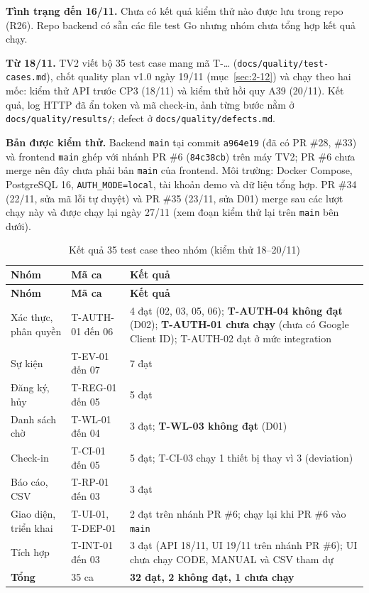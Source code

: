\textbf{Tình trạng đến 16/11.} Chưa có kết quả kiểm thử nào được lưu trong repo (R26). Repo backend có sẵn các file test Go nhưng nhóm chưa tổng hợp kết quả chạy.

\textbf{Từ 18/11.} TV2 viết bộ 35 test case mang mã T-\ldots{} (\texttt{docs/\allowbreak quality/\allowbreak test-cases.md}), chốt quality plan v1.0 ngày 19/11 (mục~\ref{sec:2-12}) và chạy theo hai mốc: kiểm thử API trước CP3 (18/11) và kiểm thử hồi quy A39 (20/11). Kết quả, log HTTP đã ẩn token và mã check-in, ảnh từng bước nằm ở \texttt{docs/\allowbreak quality/\allowbreak results/}; defect ở \texttt{docs/\allowbreak quality/\allowbreak defects.md}.

\textbf{Bản được kiểm thử.} Backend \texttt{main} tại commit \texttt{a964e19} (đã có PR \#28, \#33) và frontend \texttt{main} ghép với nhánh PR \#6 (\texttt{84c38cb}) trên máy TV2; PR \#6 chưa merge nên đây chưa phải bản \texttt{main} của frontend. Môi trường: Docker Compose, PostgreSQL 16, \texttt{AUTH\_MODE=local}, tài khoản demo và dữ liệu tổng hợp. PR \#34 (22/11, sửa mã lỗi tự duyệt) và PR \#35 (23/11, sửa D01) merge sau các lượt chạy này và được chạy lại ngày 27/11 (xem đoạn kiểm thử lại trên \texttt{main} bên dưới).

\begingroup\tblsetup\tblzebra
\begin{longtable}{L{3.6cm}L{4.2cm}L{5.2cm}}
\caption{Kết quả 35 test case theo nhóm (kiểm thử 18--20/11)}\label{tab:test-results}\\
\toprule
{}\textbf{Nhóm} & \textbf{Mã ca} & \textbf{Kết quả} \\
\midrule
\endfirsthead
\toprule
{}\textbf{Nhóm} & \textbf{Mã ca} & \textbf{Kết quả} \\
\midrule
\endhead
\bottomrule
\endlastfoot
Xác thực, phân quyền & T-AUTH-01 đến 06 & 4 đạt (02, 03, 05, 06); \textbf{T-AUTH-04 không đạt} (D02); \textbf{T-AUTH-01 chưa chạy} (chưa có Google Client ID); T-AUTH-02 đạt ở mức integration \\
Sự kiện & T-EV-01 đến 07 & 7 đạt \\
Đăng ký, hủy & T-REG-01 đến 05 & 5 đạt \\
Danh sách chờ & T-WL-01 đến 04 & 3 đạt; \textbf{T-WL-03 không đạt} (D01) \\
Check-in & T-CI-01 đến 05 & 5 đạt; T-CI-03 chạy 1 thiết bị thay vì 3 (deviation) \\
Báo cáo, CSV & T-RP-01 đến 03 & 3 đạt \\
Giao diện, triển khai & T-UI-01, T-DEP-01 & 2 đạt trên nhánh PR \#6; chạy lại khi PR \#6 vào \texttt{main} \\
Tích hợp & T-INT-01 đến 03 & 3 đạt (API 18/11, UI 19/11 trên nhánh PR \#6); UI chưa chạy CODE, MANUAL và CSV tham dự \\
\midrule
\textbf{Tổng} & 35 ca & \textbf{32 đạt, 2 không đạt, 1 chưa chạy} \\
\end{longtable}
\endgroup

